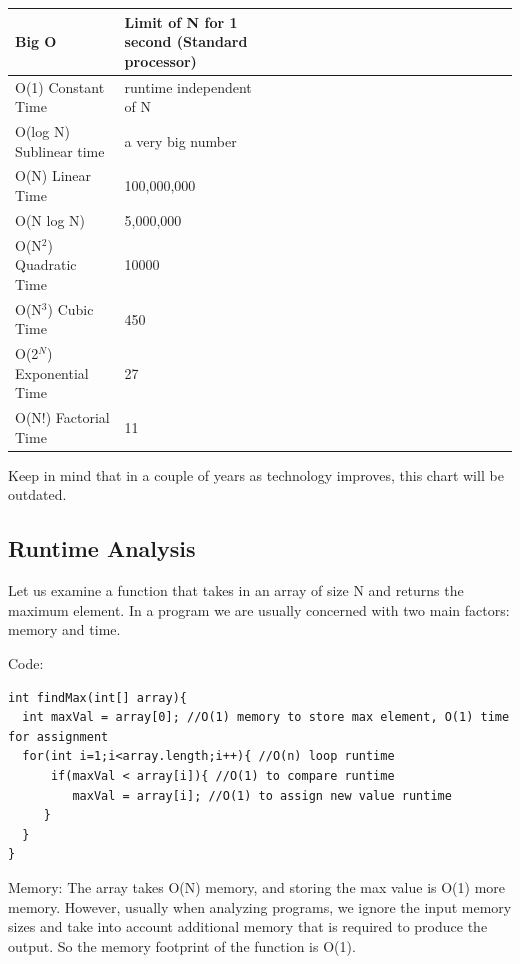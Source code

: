 \documentclass[11pt,oneside]{book}
\begin{document}
\vspace{10px}\begin{tabulary}{0.4\linewidth}{|l|l|l|l|l|l|l|l|l|l|l|l|l|l|l|l|l|l|l}\hline


  Big O &
  Limit of N for 1 second (Standard processor)\\
\hline


  O(1) Constant Time &
  runtime independent of N\\

  O(log N) Sublinear time &
  a very big number\\

  O(N) Linear Time &
  100,000,000\\

  O(N log N) &
  5,000,000\\

  O(N$^{2}$) Quadratic Time &
  10000\\

  O(N$^{3}$) Cubic Time &
  450\\

  O(2$^{N}$) Exponential Time &
  27\\

  O(N!) Factorial Time &
  11\\

\hline\end{tabulary}

Keep in mind that in a couple of years as technology improves, this chart will be outdated.

\subsection{Runtime Analysis}

Let us examine a function that takes in an array of size N and returns the maximum element. In a program we are usually concerned with two main factors: memory and time.

Code:

\begin{lstlisting}
int findMax(int[] array){
  int maxVal = array[0]; //O(1) memory to store max element, O(1) time for assignment
  for(int i=1;i<array.length;i++){ //O(n) loop runtime
      if(maxVal < array[i]){ //O(1) to compare runtime
         maxVal = array[i]; //O(1) to assign new value runtime
     }
  }
}
\end{lstlisting}

Memory: The array takes O(N) memory, and storing the max value is O(1) more memory. However, usually when analyzing programs, we ignore the input memory sizes and take into account additional memory that is required to produce the output. So the memory footprint of the function is O(1).
\end{document}
